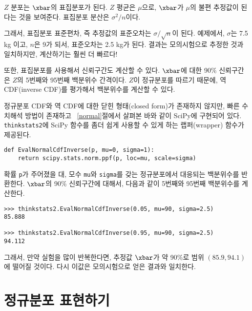 $Z$ 분포는 $\xbar$의 표집분포가 된다.
$Z$ 평균은 $\mu$으로, $\xbar$가 $\mu$의 불편 추정값이 된다는 것을 보여준다.
표집분포 분산은 $\sigma^2 / n$이다.

그래서, 표집분포 표준편차, 즉 추정값의 표준오차는 $\sigma / \sqrt{n}$이 된다. 예제에서, $\sigma$는 7.5 kg 이고, $n$은 9가 되서, 표준오차는 2.5 kg가 된다.
결과는 모의시험으로 추정한 것과 일치하지만, 계산하기는 훨씬 더 빠르다!

또한, 표집분포를 사용해서 신뢰구간도 계산할 수 있다.
$\xbar$에 대한 90\% 신뢰구간은 $Z$의 5번째와 95번째 백분위수 간격이다.
$Z$이 정규분포를 따르기 때문에, 역 CDF(inverse CDF)를 평가해서 백분위수를 계산할 수 있다.

정규분포 CDF와 역 CDF에 대한 닫힌 형태(closed form)가 존재하지 않지만, 
빠른 수치해석 방법이 존재하고 ~\ref{normal}절에서 살펴본 바와 같이 SciPy에 
구현되어 있다. {\tt thinkstats2}에 SciPy 함수를 좀더 쉽게 사용할 수 있게 하는 랩퍼(wrapper) 함수가 제공된다.

\begin{verbatim}
def EvalNormalCdfInverse(p, mu=0, sigma=1):
    return scipy.stats.norm.ppf(p, loc=mu, scale=sigma)
\end{verbatim}

확률 {\tt p}가 주어졌을 대, 모수 {\tt mu}와 {\tt sigma}를 갖는 정규분포에서 대응되는 백분위수를 반환한다. 
$\xbar$의 90\% 신뢰구간에 대해서, 
다음과 같이 5번째와 95번째 백분위수를 계산한다.

\begin{verbatim}
>>> thinkstats2.EvalNormalCdfInverse(0.05, mu=90, sigma=2.5)
85.888

>>> thinkstats2.EvalNormalCdfInverse(0.95, mu=90, sigma=2.5)
94.112
\end{verbatim}

그래서, 만약 실험을 많이 반복한다면, 추정값 $\xbar$가 약 90\%로 범위 $(85.9, 94.1)$에 떨어질 것이다. 
다시 이값은 모의시험으로 얻은 결과와 일치한다.


\section{정규분포 표현하기}

